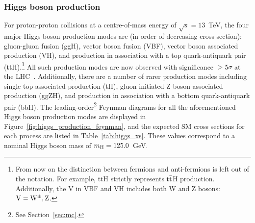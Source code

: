 \subsubsection{Higgs boson production}
For proton-proton collisions at a centre-of-mass energy of $\sqrt{s}=13$~TeV, the four major Higgs boson production modes are (in order of decreasing cross section): gluon-gluon fusion (ggH), vector boson fusion (VBF), vector boson associated production (VH), and production in association with a top quark-antiquark pair (ttH).\footnote{From now on the distinction between fermions and anti-fermions is left out of the notation. For example, ttH strictly represents t$\bar{\rm{t}}$H production. Additionally, the V in VBF and VH includes both W and Z bosons: ${\rm{V}}={\rm{W}}^{\pm},{\rm{Z}}$.} All such production modes are now observed with significance $>$5$\sigma$ at the LHC~\cite{CMS-PAS-HIG-19-005,Aad:2019mbh}. Additionally, there are a number of rarer production modes including single-top associated production (tH), gluon-initiated Z boson associated production (ggZH), and production in association with a bottom quark-antiquark pair (bbH). The leading-order\footnote{See Section~\ref{sec:mc}.} Feynman diagrams for all the aforementioned Higgs boson production modes are displayed in Figure~\ref{fig:higgs_production_feynman}, and the expected SM cross sections for each process are listed in Table~\ref{tab:higgs_xs}. These values correspond to a nominal Higgs boson mass of $m_{\rm{H}}=125.0$~GeV.

